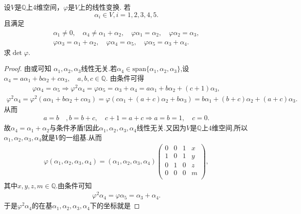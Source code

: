 \documentclass[../../main.tex]{subfiles}
\begin{document}
\begin{example}
设$V$是$\mathbb{Q}$上4维空间，$\varphi$是$V$上的线性变换. 若
$$\alpha_i \in V, i = 1,2,3,4,5.$$
且满足
\begin{gather*}
\alpha _1\ne 0,\quad \alpha _4\ne \alpha _1+\alpha _2,\quad \varphi \alpha _1=\alpha _2,\quad \varphi \alpha _2=\alpha _3,
\\
\varphi \alpha _3=\alpha _1+\alpha _2,\quad \varphi \alpha _4=\alpha _5,\quad \varphi \alpha _5=\alpha _3+\alpha _4.
\end{gather*}
求$\det \varphi$.
\end{example}
\begin{proof}
由或可知
$\alpha_1,\alpha_2,\alpha_3$线性无关.若$\alpha_4\in \mathrm{span}\{\alpha_1,\alpha_2,\alpha_3\}$,设
$\alpha_4=a\alpha_1+b\alpha_2+c\alpha_3,\quad a,b,c\in \mathbb{Q}.$
由条件可得
\begin{align*}
\varphi \alpha_4=\alpha_5\Longrightarrow \varphi^2\alpha_4=\varphi \alpha_5=\alpha_3+\alpha_4=a\alpha_1+b\alpha_2+(c+1)\alpha_3,
\end{align*}
\begin{align*}
\varphi^2\alpha_4=\varphi^2(a\alpha_1+b\alpha_2+c\alpha_3)=\varphi\left(c\alpha_1+(a+c)\alpha_2+b\alpha_3\right)=b\alpha_1+(b+c)\alpha_2+(a+c)\alpha_3.
\end{align*}
从而
\begin{align*}
a=b\quad ,b=b+c,\quad c+1=a+c\Longrightarrow a=b=1,\quad c=0.
\end{align*}
故$\alpha_4=\alpha_1+\alpha_2$与条件矛盾!因此$\alpha_1,\alpha_2,\alpha_3,\alpha_4$线性无关.又因为$V$是$\mathbb{Q}$上$4$维空间,所以$\alpha_1,\alpha_2,\alpha_3,\alpha_4$就是$V$的一组基.从而
\begin{align*}
\varphi\left( \alpha_1,\alpha_2,\alpha_3,\alpha_4 \right)=\left( \alpha_1,\alpha_2,\alpha_3,\alpha_4 \right)\begin{pmatrix}
0&		0&		1&		x\\
1&		0&		1&		y\\
0&		1&		0&		z\\
0&		0&		0&		m\\
\end{pmatrix},
\end{align*}
其中$x,y,z,m\in \mathbb{Q}$.由条件可知
\begin{align*}
\varphi^2\alpha_4=\varphi \alpha_5=\alpha_3+\alpha_4.
\end{align*}
于是$\varphi^2\alpha_4$的在基$\alpha_1,\alpha_2,\alpha_3,\alpha_4$下的坐标就是

\end{proof}
\end{document}
